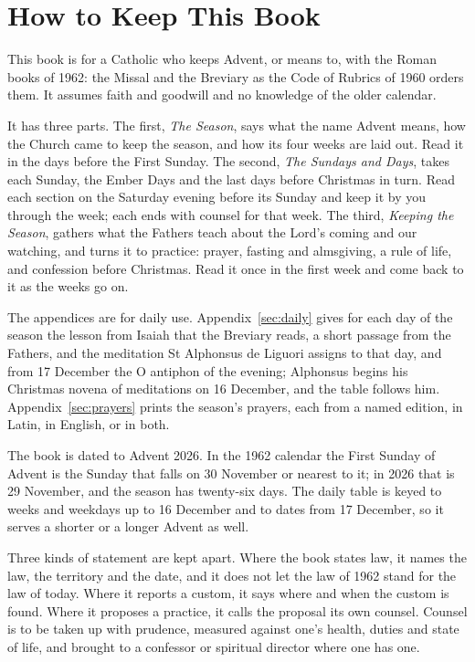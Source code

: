 \section*{How to Keep This Book}

This book is for a Catholic who keeps Advent, or means to, with the Roman books of 1962: the
Missal and the Breviary as the Code of Rubrics of 1960 orders them. It assumes faith and
goodwill and no knowledge of the older calendar.

It has three parts. The first, \emph{The Season}, says what the name Advent means, how the
Church came to keep the season, and how its four weeks are laid out. Read it in the days before
the First Sunday. The second, \emph{The Sundays and Days}, takes each Sunday, the Ember Days and
the last days before Christmas in turn. Read each section on the Saturday evening before its
Sunday and keep it by you through the week; each ends with counsel for that week. The third,
\emph{Keeping the Season}, gathers what the Fathers teach about the Lord's coming and our
watching, and turns it to practice: prayer, fasting and almsgiving, a rule of life, and
confession before Christmas. Read it once in the first week and come back to it as the weeks go
on.

The appendices are for daily use. Appendix~\ref{sec:daily} gives for each day of the season the
lesson from Isaiah that the Breviary reads, a short passage from the Fathers, and the
meditation St Alphonsus de Liguori assigns to that day, and from 17 December the O antiphon of
the evening; Alphonsus begins his Christmas novena of meditations on 16 December, and the table
follows him. Appendix~\ref{sec:prayers} prints the
season's prayers, each from a named edition, in Latin, in English, or in both.

The book is dated to Advent 2026. In the 1962 calendar the First Sunday of Advent is the Sunday
that falls on 30 November or nearest to it; in 2026 that is 29 November, and the season has
twenty-six days. The daily table is keyed to weeks and weekdays up to 16 December and to dates
from 17 December, so it serves a shorter or a longer Advent as well.

Three kinds of statement are kept apart. Where the book states law, it names the law, the
territory and the date, and it does not let the law of 1962 stand for the law of today. Where it
reports a custom, it says where and when the custom is found. Where it proposes a practice, it
calls the proposal its own counsel. Counsel is to be taken up with prudence, measured against
one's health, duties and state of life, and brought to a confessor or spiritual director where
one has one.
